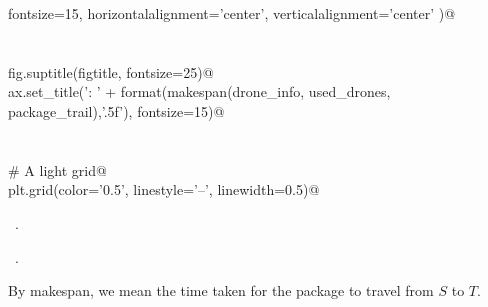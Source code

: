 \documentclass[10.0pt]{report}
\begin{document}
\begin{flushleft}
\begin{list}{}{}
\mbox{}\verb@                  fontsize=15, horizontalalignment='center', verticalalignment='center' )@\\
\mbox{}\verb@@\\
\mbox{}\verb@@\\
\mbox{}\verb@    fig.suptitle(figtitle, fontsize=25)@\\
\mbox{}\verb@    ax.set_title('\nMakespan: ' + format(makespan(drone_info, used_drones, package_trail),'.5f'), fontsize=15)@\\
\mbox{}\verb@@\\
\mbox{}\verb@@\\
\mbox{}\verb@    # A light grid@\\
\mbox{}\verb@    plt.grid(color='0.5', linestyle='--', linewidth=0.5)@\\
\mbox{}\verb@@{\NWsep}
\end{list}
\vspace{-1.5ex}
\footnotesize
\begin{list}{}{\setlength{\itemsep}{-\parsep}\setlength{\itemindent}{-\leftmargin}}
\item \NWtxtMacroDefBy\ .
\item \NWtxtMacroRefIn\ .

\item{}
\end{list}
\vspace{4ex}
\end{flushleft}


By makespan, we mean the time taken for the package to travel from $S$ to $T$.
\end{document}
